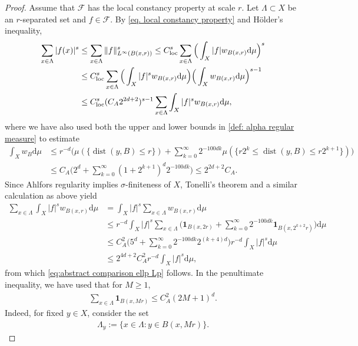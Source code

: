 \documentclass[12pt,reqno]{amsart}
\theoremstyle{definition}
\theoremstyle{remark}
\numberwithin{equation}{section}
\newcommand{\1}{\mathbbm{1}}
\DeclareMathOperator{\dist}{dist}
\def\rd{\mathrm{d}}
\begin{document}
\begin{proof}
  Assume that $\mathcal{F}$ has the local constancy property at scale $r$.
  Let $\Lambda\subset X$ be an $r$-separated set and $f\in \mathcal{F}$. By \eqref{eq. local constancy property} and H\"older's inequality,
  \begin{align*}
    \sum_{x\in\Lambda}|f(x)|^s
    & \leq \sum_{x\in\Lambda}\|f\|_{L^{\infty}(B(x,r))}^s    
      \leq C_{\rm loc}^s \sum_{x\in\Lambda}\Big(\int_{X}|f|w_{B(x,r)}\rd\mu\Big)^s \\
   & \leq C_{\rm loc}^s \sum_{x\in\Lambda} \Big(\int_{X}|f|^sw_{B(x,r)}\rd\mu\Big)\Big(\int_X w_{B(x,r)}\rd\mu\Big)^{s-1} \\
    &\leq C_{\rm loc}^s (C_A2^{2d+2})^{s-1}\sum_{x\in\Lambda}\int_{X}|f|^sw_{B(x,r)}\rd\mu,
  \end{align*}
  where we have also used both the upper and lower bounds in \eqref{def: alpha regular measure} to estimate
  \begin{align*}
    \int_X w_B\rd \mu
    & \leq r^{-d}\big(\mu(\{\dist(y,B)\leq r\})+\sum_{k=0}^{\infty}2^{-100dk}\mu(\{r2^k\leq\dist(y,B)\leq r2^{k+1}\})\big) \\
    & \leq C_A\big(2^d+\sum_{k=0}^{\infty}(1+2^{k+1})^d2^{-100dk}\big)\leq 2^{2d+2}C_A.
  \end{align*}
  Since Ahlfors regularity implies $\sigma$-finiteness of $X$, Tonelli's theorem  and a similar calculation as above yield
  \begin{align*}
    \sum_{x\in\Lambda}\int_{X}|f|^sw_{B(x,r)}\rd\mu
    & = \int_{X}|f|^s\sum_{x\in\Lambda}w_{B(x,r)} \rd\mu\\
    & \leq r^{-d}\int_{X}|f|^s\sum_{x\in\Lambda}\big(\mathbf{1}_{B(x,2r)}+\sum_{k=0}^{\infty}2^{-100dk}\mathbf{1}_{B(x,2^{k+2}r)}\big)\rd\mu \\
    & \leq C_A^2\big(5^d+\sum_{k=0}^{\infty}2^{-100dk}2^{(k+4)d}\big)r^{-d}\int_X |f|^s\rd\mu\\
    & \leq 2^{4d+2}C_A^2r^{-d}\int_X |f|^s\rd\mu,
  \end{align*}
  from which \eqref{eq:abstract comparison ellp Lp} follows. In the penultimate inequality, we have used that for $M\geq 1$,
  \begin{align}\label{eq: abstract overlap bound}
    \sum_{x\in\Lambda}\mathbf{1}_{B(x,Mr)}\leq C_A^2(2M+1)^d.
  \end{align}
  Indeed, for fixed $y\in X$, consider the set
  \begin{align*}
    \Lambda_y := \{x\in \Lambda:y\in B(x,Mr)\}.
  \end{align*}

\end{proof}
\end{document}
